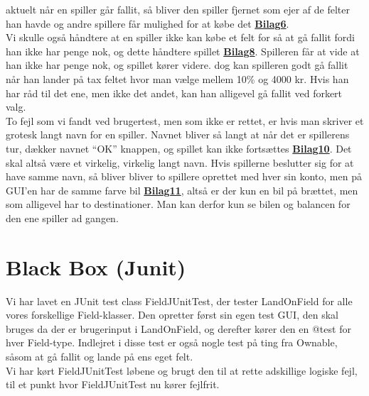 aktuelt når en spiller går fallit, så bliver den spiller fjernet som ejer af de
felter han havde og andre spillere får mulighed for at købe det
\textbf{\hyperref[bilag6]{Bilag6}}.\\
\indent Vi skulle også håndtere at en spiller ikke kan købe et felt for så at gå
fallit fordi han ikke har penge nok, og dette håndtere spillet
\textbf{\hyperref[bilag8]{Bilag8}}.
Spilleren får at vide at han ikke har penge nok, og spillet kører videre. dog
kan spilleren godt gå fallit når han lander på tax feltet hvor man vælge mellem
10\% og 4000 kr. Hvis han har råd til det ene, men ikke det andet, kan han
alligevel gå fallit ved forkert valg.\\
\indent To fejl som vi fandt ved brugertest, men som ikke er rettet, er hvis man 
skriver et grotesk langt navn for en spiller. Navnet bliver så langt at når det er
spillerens tur, dækker navnet “OK” knappen, og spillet kan ikke fortsættes
\textbf{\hyperref[bilag10]{Bilag10}}. Det skal altså være et virkelig, virkelig
langt navn. Hvis spillerne beslutter sig for at have samme navn, så bliver bliver to spillere
oprettet med hver sin konto, men på GUI’en har de samme farve bil
\textbf{\hyperref[bilag11]{Bilag11}}, altså er der kun en bil på brættet, men
som alligevel har to destinationer. Man kan derfor kun se bilen og balancen for den
ene spiller ad gangen.
\section*{Black Box (Junit)}
Vi har lavet en JUnit test class FieldJUnitTest, der tester LandOnField for alle
vores forskellige Field-klasser. Den opretter først sin egen test GUI, den skal
bruges da der er brugerinput i LandOnField, og derefter kører den en @test for
hver Field-type. Indlejret i disse test er også nogle test på ting fra Ownable,
såsom at gå fallit og lande på ens eget felt.\\
\indent Vi har kørt FieldJUnitTest løbene og brugt den til at rette adskillige
logiske fejl, til et punkt hvor FieldJUnitTest nu kører fejlfrit.
